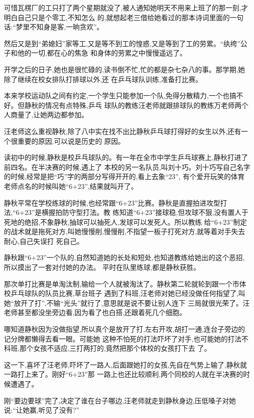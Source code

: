 ﻿\documentclass[12pt]{article}
\begin{document}
可惜瓦楞厂的工只打了两个星期就没了,被人通知她明天不用来上班了的那一刻,才明白自己只是个零工,不知怎么
的,就想起老三借给她看过的那本诗词里面的一句话:``梦里不知身是客,一晌贪欢''。

然后又是到``弟媳妇''家等工,又是等不到工的惶惑,又是等到了工的劳累。``纨绔''公子和他的一切,都在心的焦急
和身体的劳累之中慢慢遥远了。

开学之后的日子,她也是很忙碌的,读书倒不忙,忙的都是杂七杂八的事。那学期,她除了继续在校女排队打排球以外,还
在乒乓球队训练,准备打比赛。

本来学校运动队之间有约定,一个学生只能参加一个队,免得分散精力,一个也搞不好。但静秋的情况有点特殊,乒乓
球队的教练汪老师就跟排球队的教练万老师两个人商量了,让她两边都参加。

汪老师这么重视静秋,除了八中实在找不出比静秋乒乓球打得好的女生以外,还有一个很重要的原因,可以说是历史的
原因。

读初中的时候,静秋是校乒乓球队的。有一年在全市中学生乒乓球赛上,静秋打进了前四名。在半决赛的时候,遇上了
本校的另一名队员,叫刘十巧。刘十巧写自己名字的时候,经常是把``巧''字的两部分写得开开的,看上去象``23'',
有个爱开玩笑的体育老师点名的时候叫她``6+23'',结果就叫开了。

静秋平常在学校练球的时候,也经常跟``6+23''比赛。静秋是直握拍进攻型打法,``6+23''是横握拍防守型打法。教
练知道``6+23''接球稳,但攻球不狠,没有置人于死地的绝招,不象静秋,抽球可以抽死人,发球可以发死人。所以教练
给``6+23''制定的战术就是拖死对方,叫她慢慢削,慢慢削,不指望一板子打死对方,就等着对手失去耐心,自己失误打
死自己。

静秋跟``6+23''一个队的,自然知道她的长处和短处,也知道教练给她出的这个恶招,所以摸出了一套对付她的办法。
平时在队里练球,都是静秋获胜。


那次单打比赛是单淘汰制,输给一个人就被淘汰了。静秋第二轮就轮到跟一个市体校乒乓球队的队员比赛,草台班子
遇到了科班,汪老师对她已经没做任何指望了,叫她``放开了打'',不输``光头''就行了,意思就是说不要让别人连下
三局就很光荣了。汪老师甚至都没坐旁边看,因为看了也白搭,还跟着死几个细胞。

哪知道静秋因为没做指望,所以真个是放开了打,左右开攻,胡打一通,连台子旁边的记分牌都懒得去看一眼。可能她
这种不怕死的打法吓坏了对手,也可能她的打法不科班,那个女孩不适应,三打两打的,竟然把那个体校的女孩打下去
了。

这一下,喜坏了汪老师,吓坏了一路人,后面跟她打的女孩,先自在气势上输了,静秋就一路打上来了。刚好``6+23''那
一路上也还比较顺利,两个同校的人就在半决赛的时候遭遇了。

刚``要边要球''完了,决定了谁在台子哪边,汪老师就走到静秋身边,压低嗓子对她说:``让她赢,听见了没有?''
\end{document}
